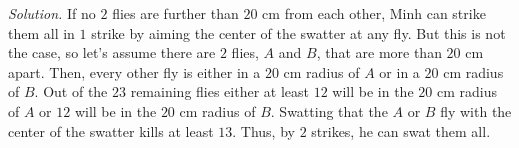 \begin{multicols}{2}
	\vskip 0.2cm
	\textit{Solution.}
	If no $2$ flies are further than $20$ cm from each other,
	Minh can strike them all in $1$ strike by aiming the center of the swatter at any fly. 
	But this is not the case, so let’s assume there are $2$ flies, $A$ and $B$, that are more than $20$ cm apart.
	Then, every other fly is either in a $20$ cm radius of $A$ or in a $20$ cm radius of $B.$
	Out of the $23$ remaining flies either at least $12$ will be in the $20$ cm radius of $A$
	or $12$ will be in the $20$ cm radius of $B$.
	Swatting that the $A$ or $B$ fly with the center of the swatter kills at least $13$.
	\vskip 0.1cm
	Thus, by $2$ strikes, he can swat them all.
\end{multicols}
